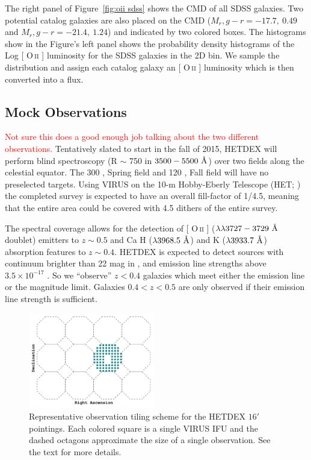 \documentclass[apj, revtex4]{emulateapj}
\makeatletter
\newcommand{\editorial}[1]{\textcolor{red}{#1}}
\DeclareRobustCommand{\ion}[2]{%
\relax\ifmmode
\ifx\testbx\f@series
{\mathbf{#1\,\mathsc{#2}}}\else
{\mathrm{#1\,\mathsc{#2}}}\fi
\else\textup{#1\,{\mdseries\textsc{#2}}}%
\fi}
\makeatother
\begin{document}
The right panel of Figure~\ref{fig:oii sdss} shows the CMD of all SDSS galaxies. Two potential catalog galaxies are also placed on the CMD ($M_r, g-r = -17.7,~0.49$ and $M_r, g-r = -21.4,~1.24$) and indicated by two colored boxes. The histograms show in the Figure's left panel shows the probability density histograms of the Log [\ion{O}{ii}] luminosity for the SDSS galaxies in the 2D bin. We sample the distribution and assign each catalog galaxy an [\ion{O}{ii}] luminosity which is then converted into a flux.

\subsection{Mock Observations}\label{sec:observations}
\editorial{Not sure this does a good enough job talking about the two different observations.}
Tentatively slated to start in the fall of 2015, HETDEX will perform blind spectroscopy (R $\sim$ 750 in $3500 - 5500~\hbox{\AA}$) over two fields along the celestial equator. The 300 \degsq, Spring field and 120 \degsq, Fall field will have no preselected targets. Using VIRUS on the 10-m Hobby-Eberly Telescope (HET; \citealt{Ramsey1998}) the completed survey is expected to have an overall fill-factor of 1/4.5, meaning that the entire area could be covered with 4.5 dithers of the entire survey. 

The spectral coverage allows for the detection of [\ion{O}{ii}] ($\lambda\lambda 3727-3729~\hbox{\AA}$ doublet) emitters to $z\sim 0.5$ and Ca H ($\lambda 3968.5~\hbox{\AA}$) and K ($\lambda 3933.7~\hbox{\AA}$) absorption features to $z\sim 0.4$. HETDEX is expected to detect sources with continuum brighter than 22 mag in \sdssg, and emission line strengths above $3.5\times10^{-17}$ \ergscm. So we ``observe'' $z<0.4$ galaxies which meet either the emission line or the magnitude limit. Galaxies $0.4<z<0.5$ are only observed if their emission line strength is sufficient.   

\begin{figure} 
	\includegraphics[width=0.49\textwidth]{f01.pdf} 
	\caption{Representative observation tiling scheme for the HETDEX $16'$ pointings. Each colored square is a single VIRUS IFU and the dashed octagons approximate the size of a single observation. See the text for more details.} \label{fig:ifu layout} 
\end{figure}
\end{document}
